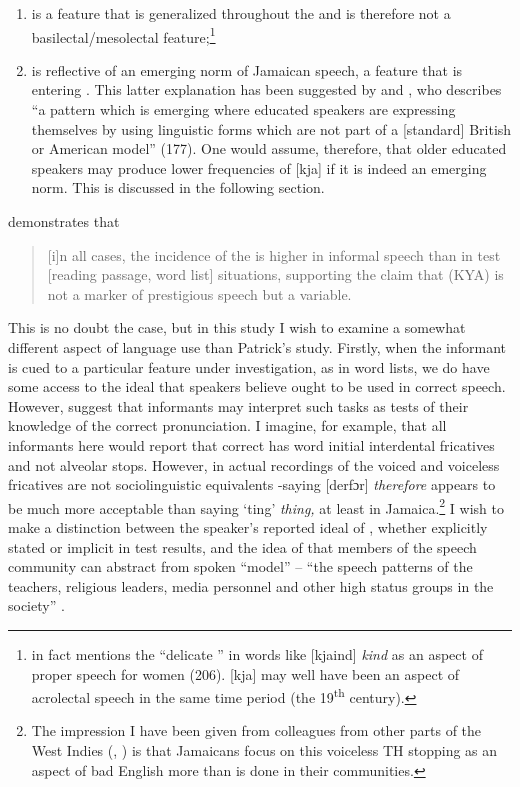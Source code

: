 \begin{enumerate}[label=\alph*)]
\item\relax [kja] is a feature that is generalized throughout the  and is therefore not a basilectal\slash mesolectal feature;\footnote{\citet{Mugglestone1995} in fact mentions the “delicate ” in words like [kjaind] \textit{kind} as an aspect of proper speech for women (206). [kja] may well have been an aspect of acrolectal speech in the same time period (the 19\textsuperscript{th} century).}
\item\relax [kja] is reflective of an emerging norm of Jamaican speech, a  feature that is entering .  This latter explanation has been suggested by \citet[31]{BeckfordWassink2001} and \citet{Miller1987}, who describes “a pattern which is emerging where educated speakers are expressing themselves by using linguistic forms which are not part of a [standard] British or American model” (177).  One would assume, therefore, that older educated speakers may produce lower frequencies of [kja] if it is indeed an emerging  norm.  This is discussed in the following section.   
\end{enumerate}

\citet[109]{Patrick1999} demonstrates that 

\begin{quote} [i]n all cases, the incidence of the  is higher in informal speech than in test [reading passage, word list] situations, supporting the claim that (KYA) is not a marker of prestigious speech but a  variable. \end{quote}

This is no doubt the case, but in this study I wish to examine a somewhat different aspect of language use than Patrick’s study.  Firstly, when the informant is cued to a particular feature under investigation, as in word lists, we do have some access to the ideal that speakers believe ought to be used in correct speech.  However, \citet[19]{MilroyMilroy1985} suggest that informants may interpret such tasks as tests of their knowledge of the correct pronunciation.  I imagine, for example, that all informants here would report that correct  has word initial interdental fricatives and not alveolar stops.  However, in actual recordings of  the voiced and voiceless fricatives are not sociolinguistic equivalents -saying [derfɔr] \textit{therefore} appears to be much more acceptable than saying ‘ting’ \textit{thing,} at least in Jamaica.\footnote{The impression I have been given from colleagues from other parts of the West Indies (, ) is that Jamaicans focus on this voiceless TH stopping as an aspect of bad English more than is done in their communities.}   I wish to make a distinction between the speaker’s reported ideal of , whether explicitly stated or implicit in test results, and the idea of  that members of the speech community can abstract from spoken “model”  –  “the speech patterns of the teachers, religious leaders, media personnel and other high status groups in the society” \citep[47]{Brodber1989}.

